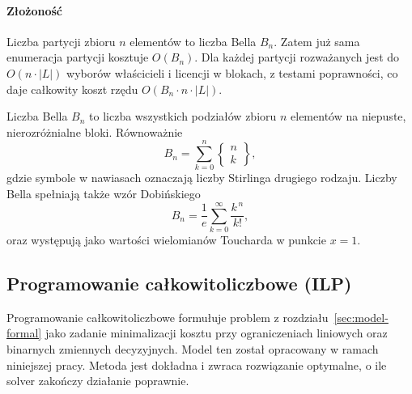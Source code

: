 \paragraph{Złożoność}
Liczba partycji zbioru \(n\) elementów to liczba Bella \(B_n\). Zatem już sama enumeracja partycji kosztuje \(O(B_n)\). Dla każdej partycji rozważanych jest do \(O(n \cdot | L|)\) wyborów właścicieli i licencji w blokach, z testami poprawności, co daje całkowity koszt rzędu \(O(B_n \cdot n \cdot | L|)\).

Liczba Bella \(B_n\) to liczba wszystkich podziałów zbioru \(n\) elementów na niepuste, nierozróżnialne bloki. Równoważnie
\[
  B_n = \sum_{k=0}^{n} \left\{\!\!\begin{array}{c} n \\ k \end{array}\!\!\right\},
\]
gdzie symbole w nawiasach oznaczają liczby Stirlinga drugiego rodzaju. Liczby Bella spełniają także wzór Dobińskiego
\[
  B_n = \frac{1}{e}\sum_{k=0}^{\infty}\frac{k^{\,n}}{k!},
\]
oraz występują jako wartości wielomianów Toucharda w punkcie \(x=1\).

\subsection{Programowanie całkowitoliczbowe (ILP)}\label{subsec:ilp}

Programowanie całkowitoliczbowe formułuje problem z rozdziału~\ref{sec:model-formal} jako zadanie 
minimalizacji kosztu przy ograniczeniach liniowych oraz binarnych zmiennych decyzyjnych. 
Model ten został opracowany w ramach niniejszej pracy.
Metoda jest dokładna i zwraca rozwiązanie optymalne, o ile solver zakończy działanie poprawnie.

